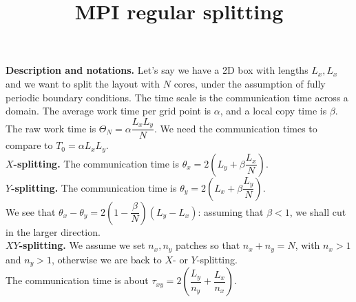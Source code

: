 \documentclass[aps]{revtex4}
\begin{document}
\title{MPI regular splitting}
\maketitle
	
\textbf{Description and notations.}
Let's say we have a 2D box with lengths $L_x,L_x$ and
we want to split the layout with $N$ cores, under the assumption
of fully periodic boundary conditions.
The time scale is the communication time across a domain.
The average work time per grid point is $\alpha$, and
a local copy time is $\beta$. The raw
work time is $\Theta_N=\alpha\dfrac{L_xL_y}{N}$. We need
the communication times to compare to $T_0=\alpha L_xL_y$.\\

\textbf{$X$-splitting.}
The communication time is $\theta_x=2\left(L_y + \beta \dfrac{L_x}{N}\right)$.\\

\textbf{$Y$-splitting.}
The communication time is $\theta_y=2\left(L_x + \beta \dfrac{L_y}{N}\right)$.\\

We see that $\theta_x-\theta_y=2\left(1-\dfrac{\beta}{N}\right)\left(L_y-L_x\right)$: assuming that $\beta<1$, we
shall cut in the larger direction.\\

\textbf{$XY$-splitting.} We assume we set $n_x,n_y$ patches so that $n_x+n_y=N$,
with $n_x>1$ and $n_y>1$, otherwise we are back to $X$- or $Y$-splitting.\\
The communication time is about $\tau_{xy}=2\left(\dfrac{L_y}{n_y}+\dfrac{L_x}{n_x}\right)$.
\end{document}
